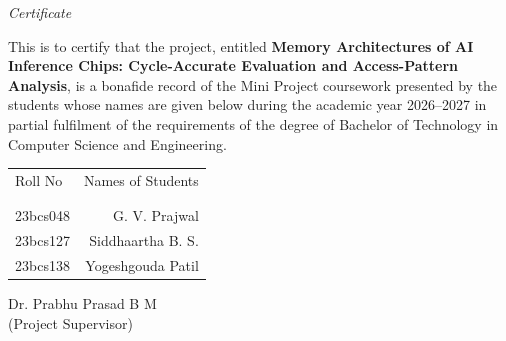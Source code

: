 \documentclass[12pt]{article}
\begin{document}
\newpage
\thispagestyle{empty}
\clearpage
\thispagestyle{empty}
\phantom{a}
\newpage
\thispagestyle{empty}

\begin{center}
	\emph{\huge{Certificate}}\\[2.5cm]
\end{center}
\normalsize This is to certify that the project, entitled \textbf{Memory Architectures of AI Inference Chips: Cycle-Accurate Evaluation and Access-Pattern Analysis}, is a bonafide record of the Mini Project coursework presented by the students whose names are given below during the academic year 2026--2027 in partial fulfilment of the requirements of the degree of Bachelor of Technology in Computer Science and Engineering.\\[1.0cm]

\begin{table}[h]
	\centering
	\begin{tabular}{lr}
		Roll No & Names of Students \\ \\ \hline
		\\
		23bcs048 & G. V. Prajwal \\
		23bcs127 & Siddhaartha B. S. \\
		23bcs138 & Yogeshgouda Patil \\
	\end{tabular}
\end{table}

\vfill

\begin{flushright}
	Dr. Prabhu Prasad B M\\
	(Project Supervisor)\\[1.5cm]
\end{flushright}

\newpage
{}
\setcounter{page}{1}
\tableofcontents
\newpage
\listoffigures
\newpage
\listoftables


\newpage
\thispagestyle{empty}
\clearpage
\thispagestyle{empty}
\phantom{a}
\newpage

\end{document}
